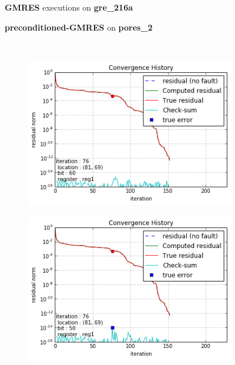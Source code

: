 \begin{figure}[h]
	\centering
    
\begin{minipage}[b]{0.45\linewidth}
\centering
\textbf{GMRES} executions on \textbf{gre_216a} 
\end{minipage}
\quad
\begin{minipage}{0.45\linewidth}
\centering
\textbf{preconditioned-GMRES} on \textbf{pores_2}
\end{minipage}\\


    \begin{minipage}[b]{0.48\linewidth}
	\begin{subfigure}[t]{\linewidth}
		\centering
		\includegraphics[width=\linewidth]{figures/gre_216a/convergence_history_checksum_0.png}
		\caption{}\label{fig:gre_216a_conv_hist_checksum_0}		
	\end{subfigure}
	\quad
	\begin{subfigure}[t]{\linewidth}
		\centering
		\includegraphics[width=\linewidth]{figures/gre_216a/convergence_history_checksum_1.png}

\end{subfigure}
\end{minipage}
\end{figure}
